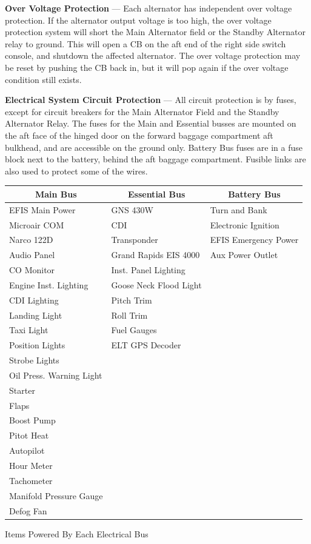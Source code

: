 \textbf{Over Voltage Protection} --- Each alternator has independent over voltage protection. If the alternator output voltage is too high, the over voltage protection system will short the Main Alternator field or the Standby Alternator relay to ground. This will open a CB on the aft end of the right side switch console, and shutdown the affected alternator. The over voltage protection may be reset by pushing the CB back in, but it will pop again if the over voltage condition still exists.

\textbf{Electrical System Circuit Protection} --- All circuit protection is by fuses, except for circuit breakers for the Main Alternator Field and the Standby Alternator Relay. The fuses for the Main and Essential busses are mounted on the aft face of the hinged door on the forward baggage compartment aft bulkhead, and are accessible on the ground only.  Battery Bus fuses are in a fuse block next to the battery, behind the aft baggage compartment. Fusible links are also used to protect some of the wires.

\clearpage %
\begin{center}
\begin{tabular}
{|l|l|l|} \hline \multicolumn{1}{|c|}{Main Bus}& \multicolumn{1}{c|}{Essential Bus} & \multicolumn{1}{c|}{Battery Bus}\tabularnewline \hline \hline EFIS Main Power & GNS 430W & Turn and Bank\tabularnewline \hline Microair COM &CDI & Electronic Ignition\tabularnewline \hline Narco 122D & Transponder & EFIS Emergency Power\tabularnewline \hline Audio Panel &Grand Rapids EIS 4000 & Aux Power Outlet\tabularnewline \hline CO Monitor &Inst. Panel Lighting & \tabularnewline \hline Engine Inst. Lighting &Goose Neck Flood Light & \tabularnewline \hline CDI Lighting &Pitch Trim & \tabularnewline \hline Landing Light &Roll Trim & \tabularnewline \hline Taxi Light &Fuel Gauges & \tabularnewline \hline Position Lights &ELT GPS Decoder & \tabularnewline \hline Strobe Lights & & \tabularnewline \hline Oil Press. Warning Light & & \tabularnewline \hline Starter & & \tabularnewline \hline Flaps & & \tabularnewline \hline Boost Pump & & \tabularnewline \hline Pitot Heat & & \tabularnewline \hline Autopilot & & \tabularnewline \hline Hour Meter & & \tabularnewline \hline Tachometer & & \tabularnewline \hline Manifold Pressure Gauge & & \tabularnewline \hline Defog Fan & & \tabularnewline \hline
\end{tabular}
\caption{Items Powered By Each Electrical Bus}
\end{center}

